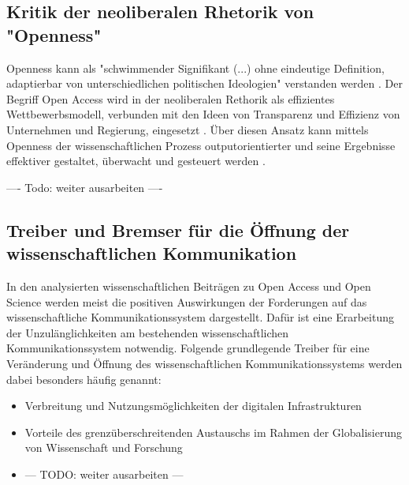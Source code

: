 \subsection{Kritik der neoliberalen Rhetorik von "Openness"}

Openness kann als "schwimmender Signifikant (...) ohne eindeutige Definition, adaptierbar von unterschiedlichen politischen Ideologien" verstanden werden \cite{Adema_2014_open_access}. Der Begriff Open Access wird in der neoliberalen Rethorik als effizientes Wettbewerbsmodell, verbunden mit den Ideen von Transparenz und Effizienz von Unternehmen und Regierung, eingesetzt \cite{tkacz_2012_open}. Über diesen Ansatz kann mittels Openness der wissenschaftlichen Prozess outputorientierter und seine Ergebnisse effektiver gestaltet, überwacht und gesteuert werden \cite{adema_2010_oaoverview} .

---- Todo: weiter ausarbeiten ----

\subsection{Treiber und Bremser für die Öffnung der wissenschaftlichen Kommunikation}

In den analysierten wissenschaftlichen Beiträgen zu Open Access und Open Science werden meist die positiven Auswirkungen der Forderungen auf das wissenschaftliche Kommunikationssystem dargestellt. Dafür ist eine Erarbeitung der Unzulänglichkeiten am bestehenden wissenschaftlichen Kommunikationssystem notwendig\cite{cite:17}. Folgende grundlegende Treiber für eine Veränderung und Öffnung des wissenschaftlichen Kommunikationssystems werden dabei besonders häufig genannt:

\begin{itemize}
\item Verbreitung und Nutzungsmöglichkeiten der digitalen Infrastrukturen
\item Vorteile des grenzüberschreitenden Austauschs im Rahmen der Globalisierung von Wissenschaft und Forschung
\item --- TODO: weiter ausarbeiten ---
\end{itemize}

